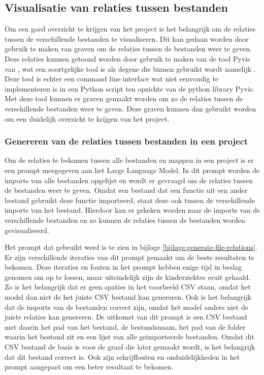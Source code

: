 \subsection{Visualisatie van relaties tussen bestanden}
\label{sec:project-documentatie-relaties}

Om een goed overzicht te krijgen van het project is het belangrijk om de relaties tussen de verschillende bestanden te visualiseren.
Dit kan gedaan worden door gebruik te maken van graven om de relaties tussen de bestanden weer te geven.
Deze relaties kunnen getoond worden door gebruik te maken van de tool Pyvis van \textcite{WHIR2018}, wat een soortgelijke tool is als degene die binnen \textcite{Doxygen2023} gebruikt wordt namelijk \textcite{GraphvizAuthors2024}.
Deze tool is echter een command line interface wat niet eenvoudig te implementeren is in een Python script ten opzichte van de python library Pyvis.
Met deze tool kunnen er graven gemaakt worden om zo de relaties tussen de verschillende bestanden weer te geven.
Deze graven kunnen dan gebruikt worden om een duidelijk overzicht te krijgen van het project.

\subsubsection{Genereren van de relaties tussen bestanden in een project}
\label{subsec:project-documentatie-relaties-genereren}

Om de relaties te bekomen tussen alle bestanden en mappen in een project is er een prompt meegegeven aan het Large Language Model.
In dit prompt worden de imports van alle bestanden opgelijst en wordt er gevraagd om de relaties tussen de bestanden weer te geven.
Omdat een bestand dat een functie uit een ander bestand gebruikt deze functie importeerd, staat deze ook tussen de verschillende imports van het bestand.
Hierdoor kan er gekeken worden naar de imports van de verschillende bestanden en zo kunnen de relaties tussen de bestanden worden gevisualiseerd.

Het prompt dat gebruikt werd is te zien in bijlage \ref{bijlage:generate-file-relations}.
Er zijn verschillende iteraties van dit prompt gemaakt om de beste resultaten te bekomen.
Deze iteraties en fouten in het prompt hebben enige tijd in beslag genomen om op te lossen, maar uiteindelijk zijn de kinderziektes eruit gehaald.
Zo is het belangrijk dat er geen spaties in het voorbeeld CSV staan, omdat het model dan niet de het juiste CSV bestand kan genereren.
Ook is het belangrijk dat de imports van de bestanden correct zijn, omdat het model anders niet de juiste relaties kan genereren. 
De uitkomst van dit prompt is een CSV bestand met daarin het pad van het bestand, de bestandsnaam, het pad van de folder waarin het bestand zit en een lijst van alle geimporteerde bestanden.
Omdat dit CSV bestand de basis is voor de graaf die later gemaakt wordt, is het belangrijk dat dit bestand correct is.
Ook zijn schrijffouten en onduidelijkheden in het prompt aangepast om een beter resultaat te bekomen.


